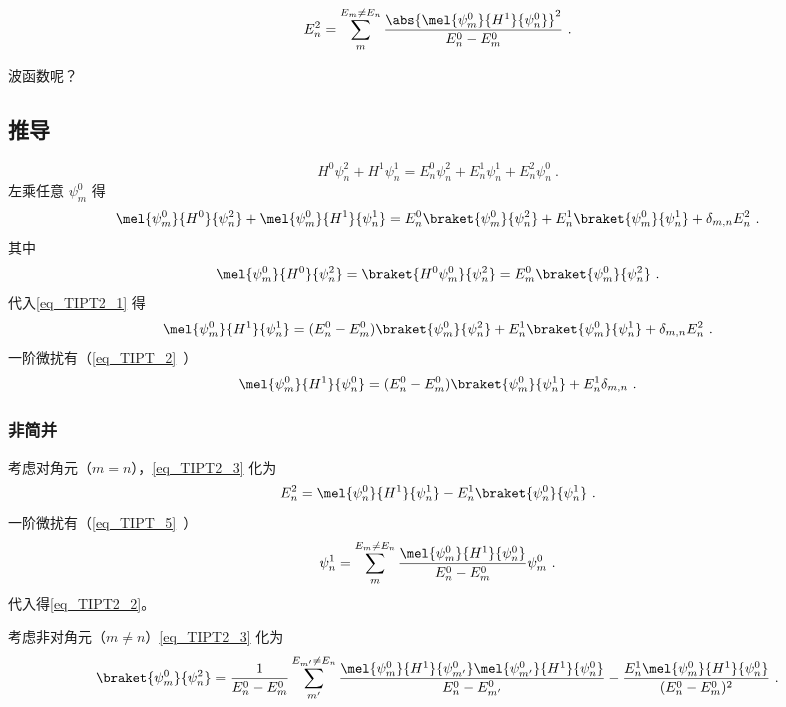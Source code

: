 
\begin{issues}
\issueDraft
\end{issues}


\begin{equation}\label{eq_TIPT2_2}
E_n^2 = \sum_{m}^{E_m\ne E_n} \frac{\abs{\mel{\psi_m^0}{H^1}{\psi_n^0}}^2}{E_n^0-E_m^0}~.
\end{equation}

波函数呢？

\subsection{推导}
\begin{equation}
H^0\psi_n^2 + H^1\psi_n^1 = E_n^0\psi_n^2 + E_n^1\psi_n^1 + E_n^2\psi_n^0~.
\end{equation}
左乘任意 $\psi_m^0$ 得
\begin{equation}\label{eq_TIPT2_1}
\mel{\psi_m^0}{H^0}{\psi_n^2} + \mel{\psi_m^0}{H^1}{\psi_n^1} = E_n^0\braket{\psi_m^0}{\psi_n^2} + E_n^1\braket{\psi_m^0}{\psi_n^1} + \delta_{m,n}E_n^2~.
\end{equation}
其中
\begin{equation}
\mel{\psi_m^0}{H^0}{\psi_n^2} = \braket{H^0\psi_m^0}{\psi_n^2} = E_m^0\braket{\psi_m^0}{\psi_n^2}~.
\end{equation}
代入\autoref{eq_TIPT2_1} 得
\begin{equation}\label{eq_TIPT2_3}
\mel{\psi_m^0}{H^1}{\psi_n^1} = (E_n^0-E_m^0)\braket{\psi_m^0}{\psi_n^2} + E_n^1\braket{\psi_m^0}{\psi_n^1} + \delta_{m,n}E_n^2~.
\end{equation}
一阶微扰有（\autoref{eq_TIPT_2}~）
\begin{equation}
\mel{\psi_m^0}{H^1}{\psi_n^0} = (E_n^0 - E_m^0) \braket{\psi_m^0}{\psi_n^1} + E_n^1 \delta_{m,n}~.
\end{equation}

\subsubsection{非简并}
考虑对角元（$m=n$），\autoref{eq_TIPT2_3} 化为
\begin{equation}
E_n^2 = \mel{\psi_n^0}{H^1}{\psi_n^1} - E_n^1\braket{\psi_n^0}{\psi_n^1}~.
\end{equation}
一阶微扰有（\autoref{eq_TIPT_5}~）
\begin{equation}
\psi_n^1 = \sum_m^{E_m\ne E_n} \frac{\mel{\psi_m^0}{H^1}{\psi_n^0}}{E_n^0 - E_m^0}\psi_m^0~.
\end{equation}
代入得\autoref{eq_TIPT2_2}。

考虑非对角元（$m\ne n$）\autoref{eq_TIPT2_3} 化为
\begin{equation}
\braket{\psi_m^0}{\psi_n^2} =
\frac{1}{E_n^0-E_m^0}\sum_{m'}^{E_{m'}\ne E_n}\frac{\mel{\psi_m^0}{H^1}{\psi_{m'}^0}\mel{\psi_{m'}^0}{H^1}{\psi_n^0}}{E_n^0 - E_{m'}^0} - \frac{E_n^1\mel{\psi_m^0}{H^1}{\psi_n^0}}{(E_n^0 - E_m^0)^2}~.
\end{equation}
